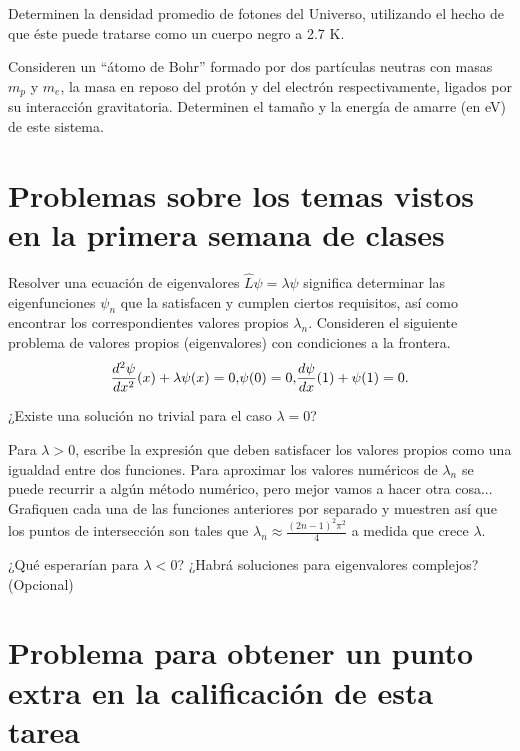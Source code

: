 \documentclass[10pt,letterpaper]{article}
\newenvironment{modenumerate}
  {\enumerate\setupmodenumerate}
  {\endenumerate}
\newif\ifmoditem
\newcommand{\setupmodenumerate}{%
  \global\moditemfalse
  \let\origmakelabel\makelabel
  \def\moditem##1{\global\moditemtrue\def\mesymbol{##1}\item}%
  \def\makelabel##1{%
    \origmakelabel{##1\ifmoditem\rlap{\mesymbol}\fi\enspace}%
    \global\moditemfalse}%
}
\begin{document}
\begin{modenumerate}
\item Determinen la densidad promedio de fotones del Universo, utilizando el hecho de que éste puede tratarse como un cuerpo negro a 2.7 K.

\item Consideren un ``átomo de Bohr'' formado por dos partículas neutras con masas $m_p$ y $m_e$, la masa en reposo del protón y del electrón respectivamente, ligados por su interacción gravitatoria. Determinen el tamaño y la energía de amarre (en eV) de este sistema.





\section{Problemas sobre los temas vistos en la primera semana de clases}

\moditem{*} Resolver una ecuación de eigenvalores $\hat{L}\psi = \lambda \psi$ significa determinar las eigenfunciones $\psi_n$ que la satisfacen y cumplen ciertos requisitos, así como encontrar los correspondientes valores propios $\lambda_n$. Consideren el siguiente problema de valores propios (eigenvalores) con condiciones a la frontera.
\begin{dmath}
{\frac{d^2 \psi}{dx^2}(x) + \lambda\psi(x) = 0,}\\
 {\psi(0) = 0,}\\ {\frac{d\psi}{dx}(1) + \psi(1) = 0.}
\end{dmath}

\begin{enumerateL}
\item ¿Existe una solución no trivial para el caso $\lambda = 0$?
\item Para $\lambda>0$, escribe la expresión que deben satisfacer los valores propios como una igualdad entre dos funciones. Para aproximar los valores numéricos de $\lambda_n$ se puede recurrir a algún método numérico, pero mejor vamos a hacer otra cosa... Grafiquen cada una de las funciones anteriores por separado y muestren así que los puntos de intersección son tales que $\lambda_n \approx \frac{(2n-1)^2\pi^2}{4}$ a medida que crece $\lambda$.
\item ¿Qué esperarían para $\lambda<0$? ¿Habrá soluciones para eigenvalores complejos? (Opcional)
\end{enumerateL}


\section{Problema para obtener un punto extra en la calificación de esta tarea}


\end{modenumerate}
\end{document}
